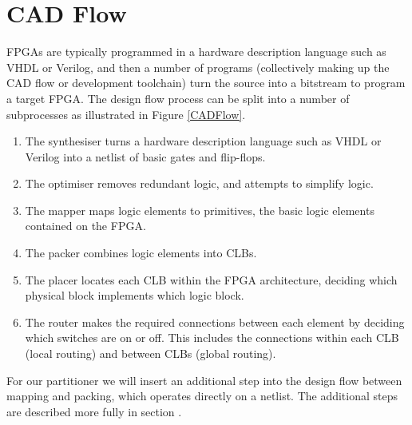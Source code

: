 \documentclass[12pt,final,oneside]{dwThesis} %
\begin{document}
 \section{\gls{CAD} Flow} \glspl{FPGA} are typically programmed
in a hardware description language such as \gls{VHDL} or Verilog, and then a
number of programs (collectively making up the \gls{CAD} flow or development
toolchain) turn the source into a bitstream to program a target \gls{FPGA}.
The design flow process can be split into a number of
subprocesses as illustrated in Figure
\ref{CADFlow}\cite{VPRBook,VPRManual,FPGAArch}.  \begin{enumerate}
      \item The synthesiser turns a hardware description language such as VHDL
            or Verilog into a netlist of basic gates and flip-flops.
      \item The optimiser removes redundant logic, and attempts to simplify
            logic.
      \item The mapper maps logic elements to \glspl{primitive}, the basic
            logic elements contained on the \gls{FPGA}.
      \item The packer combines logic elements into \glspl{CLB}.
      \item The placer locates each \gls{CLB} within the \gls{FPGA}
            architecture, deciding which physical block implements which logic
            block.
      \item The router makes the required connections between each element by
            deciding which switches are on or off. This includes the
            connections within each \gls{CLB} (local routing) and between
            \glspl{CLB} (global routing).  \end{enumerate} For our partitioner
      we will insert an additional step into the design flow between mapping
      and packing, which operates directly on a netlist. The additional steps
      are described more fully in section .
\end{document}
